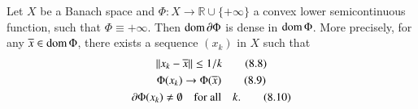 \begin{theorem}\label{chap8-thm8.3}
Let $X$ be a Banach space and $\Phi:X\to \mathbb{R}\cup\{+\infty\}$ a
convex lower semicontinuous function, such that\pageoriginale
$\Phi\equiv +\infty$. Then $\operatorname{dom} \partial\Phi$ is dense in $\operatorname{dom} \Phi$. More
precisely, for any $\overline{x}\in \operatorname{dom}\Phi$, there exists a sequence
$(x_{k})$ in $X$ such that
\begin{gather*}
||x_{k}-\overline{x}||\leq 1/k\tag{8.8}\label{chap8-eq8.8}\\
\Phi(x_{k})\to \Phi(\overline{x})\tag{8.9}\label{chap8-eq8.9}\\
\partial\Phi(x_{k})\neq \emptyset\quad\text{for all}\quad
k.\tag{8.10}\label{chap8-eq8.10} 
\end{gather*}
\end{theorem}

